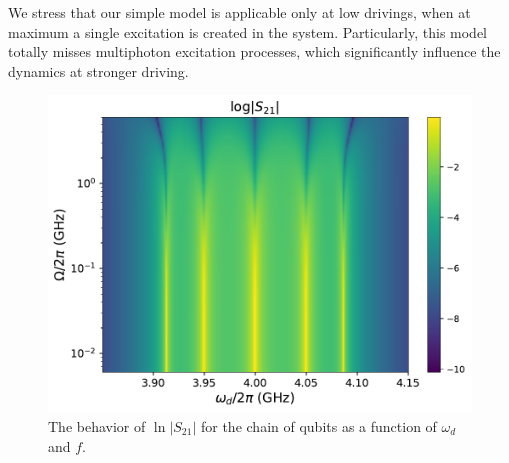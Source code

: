 \documentclass[%
 aps, pra,
 amsmath,amssymb,
 preprint,%
superscriptaddress
]{revtex4-2}
\begin{document}
We stress that our simple model is applicable only at low drivings, when at maximum a single excitation is created in the system. Particularly, this model totally misses multiphoton excitation processes, which significantly influence the dynamics at stronger driving.


\begin{figure}[h!]
\includegraphics[width=.5\linewidth]{map-s21-5qb2-w-log.pdf}
	\caption{The behavior of $\ln |S_{21}|$ for the chain of qubits as
		a function of $\omega_d$ and $f$.}
	\label{fig:qubitchain}
\end{figure}

	
\end{document}
